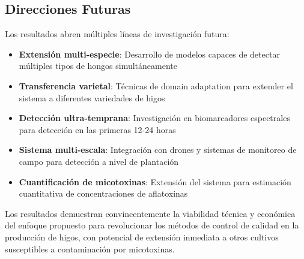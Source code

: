 \subsection{Direcciones Futuras}

Los resultados abren múltiples líneas de investigación futura:

\begin{itemize}
    \item \textbf{Extensión multi-especie}: Desarrollo de modelos capaces de detectar múltiples tipos de hongos simultáneamente
    
    \item \textbf{Transferencia varietal}: Técnicas de domain adaptation para extender el sistema a diferentes variedades de higos
    
    \item \textbf{Detección ultra-temprana}: Investigación en biomarcadores espectrales para detección en las primeras 12-24 horas
    
    \item \textbf{Sistema multi-escala}: Integración con drones y sistemas de monitoreo de campo para detección a nivel de plantación
    
    \item \textbf{Cuantificación de micotoxinas}: Extensión del sistema para estimación cuantitativa de concentraciones de aflatoxinas
\end{itemize}

Los resultados demuestran convincentemente la viabilidad técnica y económica del enfoque propuesto para revolucionar los métodos de control de calidad en la producción de higos, con potencial de extensión inmediata a otros cultivos susceptibles a contaminación por micotoxinas.
